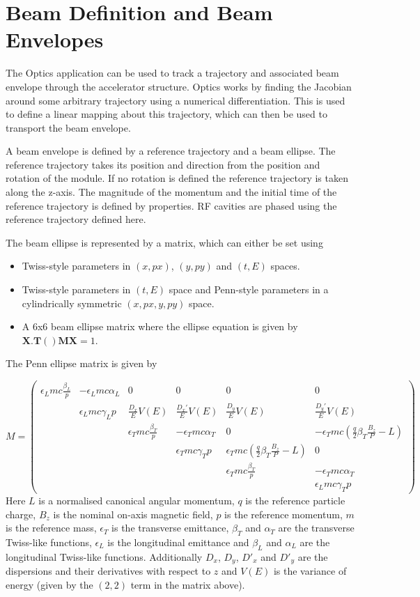 \section{Beam Definition and Beam Envelopes}
The Optics application can be used to track a trajectory and associated beam envelope through the accelerator structure.
Optics works by finding the Jacobian around some arbitrary trajectory using a numerical differentiation. This is used
to define a linear mapping about this trajectory, which can then be used to transport the beam envelope.

A beam envelope is defined by a reference trajectory and a beam ellipse. The reference trajectory takes its position and
direction from the position and rotation of the module. If no rotation is defined the reference trajectory is taken along
the z-axis. The magnitude of the momentum and the initial time of the reference trajectory is defined by properties. RF
cavities are phased using the reference trajectory defined here.

The beam ellipse is represented by a matrix, which can either be set using 

\begin{itemize}
\item Twiss-style parameters in $(x,px)$, $(y,py)$ and $(t,E)$ spaces.
\item Twiss-style parameters in $(t,E)$ space and Penn-style parameters in a cylindrically symmetric $(x,px,y,py)$ space.
\item A 6x6 beam ellipse matrix where the ellipse equation is given by $\mathbf{X}.\mathbf{T}() \mathbf{M} \mathbf{X} =
1$.
\end{itemize}
The Penn ellipse matrix is given by

\begin{equation*}
M=\left(\begin{matrix}\epsilon_Lmc\frac{\beta_L}{p}&-\epsilon_Lmc\alpha _L&0&0&0&0\\
       &\epsilon_Lmc\gamma_Lp&\frac{D_x}{E}V(E)&\frac{D_x'}{E}V(E)&\frac{D_y}{E}V(E)&\frac{D_y'}{E}V(E)\\
       &&\epsilon _Tmc\frac{\beta _T}{p}&-\epsilon_Tmc\alpha_T&0&-\epsilon _Tmc(\frac{q}{2}\beta _T\frac{B_z}{P}-L)\\
      &&&\epsilon _Tmc\gamma _Tp&\epsilon _Tmc(\frac{q}{
2}\beta _T\frac{B_z}{P}-L)&0\\&&&&\epsilon _Tmc\frac{\beta _T}{p}&-\epsilon _Tmc\alpha _T\\&&&&&\epsilon _Lmc\gamma
_Tp\end{matrix}\right)
\end{equation*}
Here $L$ is a normalised canonical angular momentum, $q$ is the reference particle charge,
$B_{z}$ is the nominal on-axis magnetic field, $p$ is the reference momentum,
$m$ is the reference mass, $\epsilon_T$ is the transverse emittance, $\beta_T$ and
$\alpha_{T}$ are the transverse Twiss-like functions, $\epsilon_{L}$ is the longitudinal emittance and
$\beta_{L}$ and $\alpha_{L}$ are the longitudinal Twiss-like functions. Additionally $D_{x}$,
$D_{y}$, $D'_{x}$ and $D'_{y}$ are the dispersions and their derivatives with respect to
$z$ and $V(E)$ is the variance of energy (given by the $(2,2)$ term in the matrix above).


